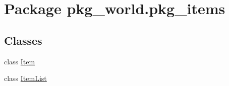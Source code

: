 \hypertarget{namespacepkg__world_1_1pkg__items}{\section{Package pkg\-\_\-world.\-pkg\-\_\-items}
\label{namespacepkg__world_1_1pkg__items}
}
\subsection*{Classes}
\begin{DoxyCompactItemize}
\item 
class \hyperlink{classpkg__world_1_1pkg__items_1_1Item}{Item}
\item 
class \hyperlink{classpkg__world_1_1pkg__items_1_1ItemList}{Item\-List}
\end{DoxyCompactItemize}
